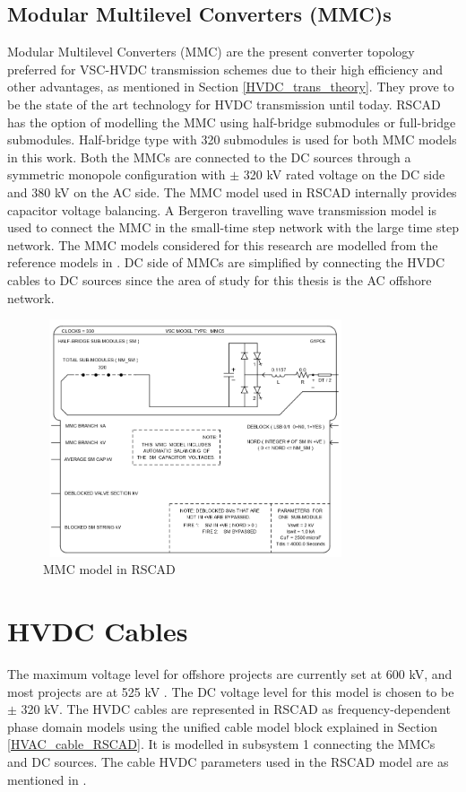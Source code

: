 \subsection{Modular Multilevel Converters (MMC)s}
Modular Multilevel Converters (\gls{MMC}) are the present converter topology preferred for \gls{VSC}-\gls{HVDC} transmission schemes due to their high efficiency and other advantages, as mentioned in Section \ref{HVDC_trans_theory}. They prove to be the state of the art technology for \gls{HVDC} transmission until today. RSCAD has the option of modelling the \gls{MMC} using half-bridge submodules or full-bridge submodules. Half-bridge type with 320 submodules is used for both \gls{MMC} models in this work. Both the \gls{MMC}s are connected to the \gls{DC} sources through a symmetric monopole configuration with $\pm$ 320 kV rated voltage on the \gls{DC} side and 380 kV on the \gls{AC} side. 
The \gls{MMC} model used in RSCAD internally provides capacitor voltage balancing. A Bergeron travelling wave transmission model is used to connect the \gls{MMC} in the small-time step network with the large time step network. The \gls{MMC} models considered for this research are modelled from the reference models in \cite{wachal2014guide}. \gls{DC} side of \gls{MMC}s are simplified by connecting the \gls{HVDC} cables to \gls{DC} sources since the area of study for this thesis is the \gls{AC} offshore network. 

\begin{figure}[H]
\centering
    \includegraphics[height = 7cm,width = 9cm]{Diagrams/Chapter_4/MMC5_RSCAD_2.PNG}
    \caption{MMC model in RSCAD}
    \label{fig:MMC5_RSCAD_2}
\end{figure}

\section{\gls{HVDC} Cables}
The maximum voltage level for offshore projects are currently set at 600 kV, and most projects are at 525 kV \cite{lagrotteria_hvdc_2019}. The \gls{DC} voltage level for this model is chosen to be $\pm$ 320 kV. The \gls{HVDC} cables are represented in RSCAD as frequency-dependent phase domain models using the unified cable model block explained in Section \ref{HVAC_cable_RSCAD}. It is modelled in subsystem 1 connecting the \gls{MMC}s and \gls{DC} sources. 
The cable \gls{HVDC} parameters used in the RSCAD model are as mentioned in \cite{wachal2014guide}.

